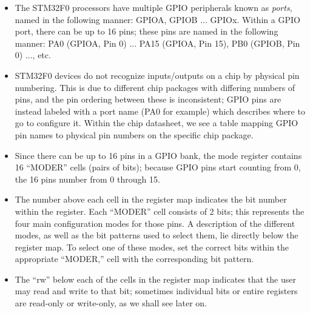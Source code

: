 \documentclass[openany,11pt,fleqn]{book} %
\begin{document}
\begin{itemize}
    \item The STM32F0 processors have multiple GPIO peripherals known as \textit{ports}, named in the following manner: GPIOA, GPIOB ... GPIOx. Within a GPIO port, there can be up to 16 pins; these pins are named in the following manner: PA0 (GPIOA, Pin 0) ... PA15 (GPIOA, Pin 15), PB0 (GPIOB, Pin 0) ..., etc.
    \item STM32F0 devices do not recognize inputs/outputs on a chip by physical pin numbering. This is due to different chip packages with differing numbers of pins, and the pin ordering between these is inconsistent; GPIO pins are instead labeled with a port name (PA0 for example) which describes where to go to configure it. Within the chip datasheet, we see a table mapping GPIO pin names to physical pin numbers on the specific chip package.
    \item Since there can be up to 16 pins in a GPIO bank, the mode register contains 16 ``MODER'' cells (pairs of bits); because GPIO pins start counting from 0, the 16 pins number from 0 through 15.
    \item The number above each cell in the register map indicates the bit number within the register. Each ``MODER'' cell consists of 2 bits; this represents the four main configuration modes for those pins. A description of the different modes, as well as the bit patterns used to select them, lie directly below the register map.
    To select one of these modes, set the correct bits within the appropriate ``MODER,'' cell with the corresponding bit pattern.
    \item The ``rw'' below each of the cells in the register map indicates that the user may read and write to that bit; sometimes individual bits or entire registers are read-only or write-only, as we shall see later on.
\end{itemize}
\end{document}
